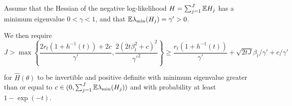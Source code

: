 \documentclass{article}
\begin{document}
\begin{lem}
    \label{lemma:hess_bound}
    Assume that the Hessian of the negative log-likelihood $H=\sum_{j=1}^J \mathbb{E} H_j$ has a minimum eigenvalue $0<\gamma<1$, and that $\mathbb{E} \lambda_{\min} (H_j) = \gamma' > 0$. 
    
    We then require 
    \begin{equation}
        J > \max\left\{\frac{2r_t(1+h^{-1}(t)) + 2c}{\gamma'}, \frac{2(2t\beta_t^2+c)^2}{\gamma'^2}\right\} \geq  \frac{r_t(1+h^{-1}(t))}{\gamma'} + \sqrt{2tJ}\beta_t/\gamma' + c/\gamma'
    \end{equation}
    
    for $\hat{H}(\theta)$ to be invertible and positive definite with minimum eigenvalue greater than or equal to $c \in (0, \sum_{j=1}^J \mathbb{E}\lambda_{\min}(H_j))$ and with probability at least $1-\exp(-t)$.
\end{lem}
\end{document}
